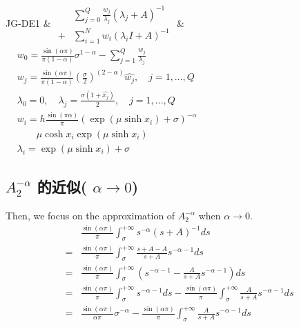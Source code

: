\begin{table}[htbp]
\begin{tabular}
		\hline
		JG-DE1 & $\begin{aligned}&\sum_{j=0}^{Q}\frac{w_{j}}{\lambda_{j}}(\lambda_{j}+A)^{-1}\\+&\sum_{i=1}^{N}w_{i}(\lambda_{i}I+A)^{-1}\end{aligned}$ & $ \begin{aligned}& w_0=\frac{\sin(\alpha \pi)}{\pi(1-\alpha)}\sigma^{1-\alpha}-\sum_{j=1}^{Q}\frac{w_j}{\lambda_j}\\& w_j=\frac{\sin(\alpha \pi)}{\pi(1-\alpha)}\left(\frac{\sigma}{2}\right)^{(2-\alpha)}\hat{w_j},\quad j=1,...,Q\\& \lambda_0=0,\quad \lambda_j=\frac{\sigma(1+\hat{x_j})}{2},\quad j=1,...,Q \\&w_i=h \frac{\sin(\pi \alpha)}{\pi}(\exp(\mu \sinh x_i)+\sigma)^{-\alpha}\\&\qquad \mu\cosh x_i\exp(\mu \sinh x_i)\\&\lambda_i=\exp(\mu \sinh x_i)+\sigma\end{aligned}$\\
		\bottomrule
	\end{tabular}
\end{table}

\subsection{$A_2^{-\alpha}$ 的近似( $\alpha \rightarrow 0$)}
Then, we focus on the approximation of $A_2^{-\alpha}$ when $\alpha \rightarrow 0 $.
\begin{equation}\begin{aligned}
&\frac{\sin(\alpha \pi)}{\pi}\int_{\sigma}^{+\infty}s^{-\alpha}(s+A)^{-1}ds\\
=& \frac{\sin(\alpha \pi)}{\pi}\int_{\sigma}^{+\infty}\frac{s+A-A}{s+A}s^{-\alpha-1}ds\\
=& \frac{\sin(\alpha \pi)}{\pi}\int_{\sigma}^{+\infty}\left(s^{-\alpha-1}-\frac{A}{s+A}s^{-\alpha-1}\right)ds\\
=& \frac{\sin(\alpha \pi)}{\pi}\int_{\sigma}^{+\infty}s^{-\alpha-1}ds-\frac{\sin(\alpha \pi)}{\pi}\int_{\sigma}^{+\infty}\frac{A}{s+A}s^{-\alpha-1}ds\\
=& \frac{\sin(\alpha \pi)}{\alpha\pi}\sigma^{-\alpha}-\frac{\sin(\alpha \pi)}{\pi}\int_{\sigma}^{+\infty}\frac{A}{s+A}s^{-\alpha-1}ds
\end{aligned}\end{equation}

